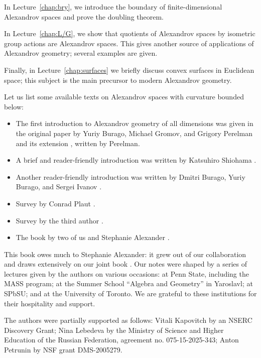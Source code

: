 In Lecture~\ref{chap:bry}, we introduce the boundary of finite-dimensional Alexandrov spaces and prove the doubling theorem.

In Lecture~\ref{chap:L/G}, we show that quotients of Alexandrov spaces by isometric group actions are Alexandrov spaces.
This gives another source of applications of Alexandrov geometry; several examples are given.

Finally, in Lecture~\ref{chap:surfaces} we briefly discuss convex surfaces in Euclidean space; this subject is the main precursor to modern Alexandrov geometry.

Let us list some available texts on Alexandrov spaces with curvature bounded below:
\begin{itemize}
\item The first introduction to Alexandrov geometry of all dimensions was given in the original paper by Yuriy Burago, Michael Gromov, and Grigory Perelman \cite{burago-gromov-perelman} and its extension \cite{perelman1991}, written by Perelman.
\item A brief and reader-friendly introduction was written by Katsuhiro Shiohama \cite[Sections 1--8]{shiohama}.
\item Another reader-friendly introduction was written by Dmitri Burago, Yuriy
Burago, and Sergei Ivanov \cite[Chapter 10]{burago-burago-ivanov}.
\item Survey by Conrad Plaut \cite{plaut:survey}.
\item Survey by the third author \cite{petrunin:survey}.
\item The book by two of us and Stephanie Alexander \cite{alexander-kapovitch-petrunin2024}.
\end{itemize}

This book owes much to Stephanie Alexander: it grew out of our collaboration and draws extensively on our joint book \cite{alexander-kapovitch-petrunin2024}.
Our notes were shaped by a series of lectures given by the authors on various occasions: at Penn State, including the MASS program; at the Summer School ``Algebra and Geometry'' in Yaroslavl; at SPbSU; and at the University of Toronto.
We are grateful to these institutions for their hospitality and support.

The authors were partially supported as follows:
Vitali Kapovitch by an NSERC Discovery Grant;
Nina Lebedeva by the Ministry of Science and Higher Education of the Russian Federation, agreement no. 075-15-2025-343;
Anton Petrunin by NSF grant DMS-2005279.


